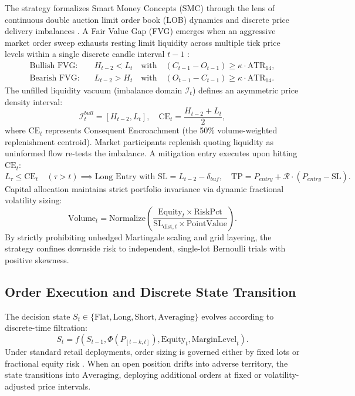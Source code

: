 \documentclass[11pt,a4paper]{article}
\begin{document}
The strategy formalizes Smart Money Concepts (SMC) through the lens of continuous double auction limit order book (LOB) dynamics and discrete price delivery imbalances \cite{cont2010stochastic, biais1995an}.
A Fair Value Gap (FVG) emerges when an aggressive market order sweep exhausts resting limit liquidity across multiple tick price levels within a single discrete candle interval $t-1$ \cite{hasbrouck1991measuring}:
\begin{align}
\text{Bullish FVG}: \quad & H_{t-2} < L_t \quad \text{with} \quad (C_{t-1} - O_{t-1}) \ge \kappa \cdot \text{ATR}_{14}, \\
\text{Bearish FVG}: \quad & L_{t-2} > H_t \quad \text{with} \quad (O_{t-1} - C_{t-1}) \ge \kappa \cdot \text{ATR}_{14}.
\end{align}
The unfilled liquidity vacuum (imbalance domain $\mathcal{I}_t$) defines an asymmetric price density interval:
\begin{equation}
\mathcal{I}_{t}^{bull} = \left[ H_{t-2}, L_t \right], \quad \text{CE}_t = \frac{H_{t-2} + L_t}{2},
\end{equation}
where $\text{CE}_t$ represents Consequent Encroachment (the 50\% volume-weighted replenishment centroid).
Market participants replenish quoting liquidity as uninformed flow re-tests the imbalance. A mitigation entry executes upon hitting $\text{CE}_t$:
\begin{equation}
L_{\tau} \le \text{CE}_t \quad (\tau > t) \implies \text{Long Entry with } \text{SL} = L_{t-2} - \delta_{buf}, \quad \text{TP} = P_{entry} + \mathcal{R} \cdot (P_{entry} - \text{SL}).
\end{equation}
Capital allocation maintains strict portfolio invariance via dynamic fractional volatility sizing:
\begin{equation}
\text{Volume}_t = \text{Normalize}\left(\frac{\text{Equity}_t \times \text{RiskPct}}{\text{SL}_{\text{dist}, t} \times \text{PointValue}}\right).
\end{equation}
By strictly prohibiting unhedged Martingale scaling and grid layering, the strategy confines downside risk to independent, single-lot Bernoulli trials with positive skewness.


\subsection{Order Execution and Discrete State Transition}
The decision state $S_t \in \{\text{Flat}, \text{Long}, \text{Short}, \text{Averaging}\}$ evolves according to discrete-time filtration:
\begin{equation}
S_{t} = f(S_{t-1}, \Phi(P_{[t-k, t]}), \text{Equity}_t, \text{MarginLevel}_t).
\end{equation}
Under standard retail deployments, order sizing is governed either by fixed lots or fractional equity risk \cite{lopez2018advances, carhart1997persistence}. When an open position drifts into adverse territory, the state transitions into $\text{Averaging}$, deploying additional orders at fixed or volatility-adjusted price intervals.
\end{document}
